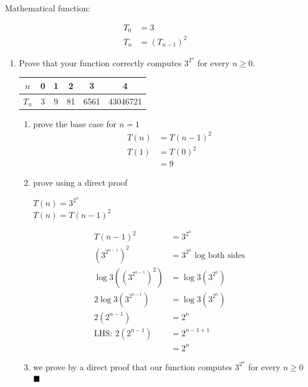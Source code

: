 \documentclass{article}
\begin{document}
\begin{itemize}
\begin{center}
            Mathematical function:
        \end{center}
        \begin{align*}
            T_0 &= 3\\
            T_n &= (T_{n-1})^2
        \end{align*}
        \begin{enumerate}[label=(\alph*)]
            \item Prove that your function correctly computes $3^{2^n}$ for every $n \geq 0$.\\
            \begin{tabular}{ c|c|c|c|c|c }
                $n$ & 0 & 1 & 2 & 3 & 4\\
                \hline
                $T_n$ & 3 & 9 & 81 & 6561 & 43046721\\
            \end{tabular}
            \begin{enumerate}[label=(\roman*)]
                \item prove the base case for $n = 1$
                \begin{align*}
                    T(n) &= T(n-1)^2\\
                    T(1) &= T(0)^2\\
                         &= 9
                \end{align*}
                \item prove using a direct proof
                \begin{center}
                    $T(n) = 3^{2^n}$\\$T(n) = T(n-1)^2$
                \end{center}
                \begin{align*}
                    T(n-1)^2 &= 3^{2^n}\\
                    (3^{2^{n-1}})^2 &= 3^{2^n} \text{ log both sides}\\
                    \log{3}((3^{2^{n-1}})^2) &= \log{3}(3^{2^n})\\
                    2\log{3}(3^{2^{n-1}}) &= \log{3}(3^{2^n})\\
                    2(2^{n-1}) &= 2^n\\
                    \text{LHS: } 2(2^{n-1}) &= 2^{n-1+1}\\
                    &= 2^n
                \end{align*}
                \item we prove by a direct proof that our function computes $3^{2^n}$ for every $n \geq 0$ $\hfill\blacksquare$

\end{enumerate}
\end{enumerate}
\end{itemize}
\end{document}
